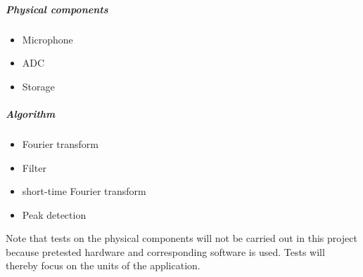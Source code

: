 \begin{multicols}{2}
\subparagraph{Physical components}  
\begin{itemize}
	\item Microphone
	\item ADC
	\item Storage
\end{itemize}
\columnbreak
\subparagraph{Algorithm}
\begin{itemize}
	\item Fourier transform
	\item Filter
	\item short-time Fourier transform
	\item Peak detection
\end{itemize}
\end{multicols}
Note that tests on the physical components will not be carried out in this project because pretested hardware and corresponding software is used. Tests will thereby focus on the units of the application.
 
